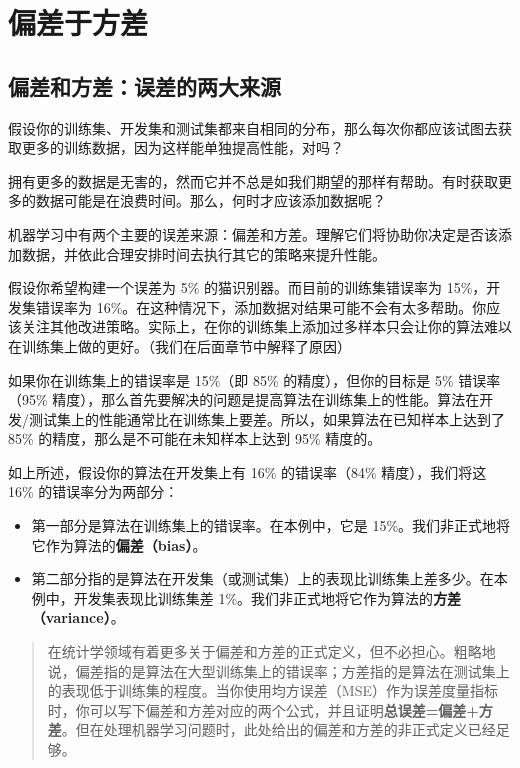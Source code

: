 \hypertarget{ux504fux5deeux4e8eux65b9ux5dee}{%
\part{偏差于方差}\label{ux504fux5deeux4e8eux65b9ux5dee}}

\hypertarget{ux504fux5deeux548cux65b9ux5deeux8befux5deeux7684ux4e24ux5927ux6765ux6e90}{%
\chapter{偏差和方差：误差的两大来源}\label{ux504fux5deeux548cux65b9ux5deeux8befux5deeux7684ux4e24ux5927ux6765ux6e90}}

假设你的训练集、开发集和测试集都来自相同的分布，那么每次你都应该试图去获取更多的训练数据，因为这样能单独提高性能，对吗？

拥有更多的数据是无害的，然而它并不总是如我们期望的那样有帮助。有时获取更多的数据可能是在浪费时间。那么，何时才应该添加数据呢？

机器学习中有两个主要的误差来源：偏差和方差。理解它们将协助你决定是否该添加数据，并依此合理安排时间去执行其它的策略来提升性能。

假设你希望构建一个误差为 5\% 的猫识别器。而目前的训练集错误率为
15\%，开发集错误率为
16\%。在这种情况下，添加数据对结果可能不会有太多帮助。你应该关注其他改进策略。实际上，在你的训练集上添加过多样本只会让你的算法难以在训练集上做的更好。（我们在后面章节中解释了原因）

如果你在训练集上的错误率是 15\%（即 85\% 的精度），但你的目标是 5\%
错误率（95\%
精度），那么首先要解决的问题是提高算法在训练集上的性能。算法在开发/测试集上的性能通常比在训练集上要差。所以，如果算法在已知样本上达到了
85\% 的精度，那么是不可能在未知样本上达到 95\% 精度的。

如上所述，假设你的算法在开发集上有 16\% 的错误率（84\% 精度），我们将这
16\% 的错误率分为两部分：

\begin{itemize}
\tightlist
\item
  第一部分是算法在训练集上的错误率。在本例中，它是
  15\%。我们非正式地将它作为算法的\textbf{偏差（bias）}。
\item
  第二部分指的是算法在开发集（或测试集）上的表现比训练集上差多少。在本例中，开发集表现比训练集差
  1\%。我们非正式地将它作为算法的\textbf{方差（variance）}。
\end{itemize}

\begin{quote}
在统计学领域有着更多关于偏差和方差的正式定义，但不必担心。粗略地说，偏差指的是算法在大型训练集上的错误率；方差指的是算法在测试集上的表现低于训练集的程度。当你使用均方误差（MSE）作为误差度量指标时，你可以写下偏差和方差对应的两个公式，并且证明\textbf{总误差=偏差+方差}。但在处理机器学习问题时，此处给出的偏差和方差的非正式定义已经足够。
\end{quote}


